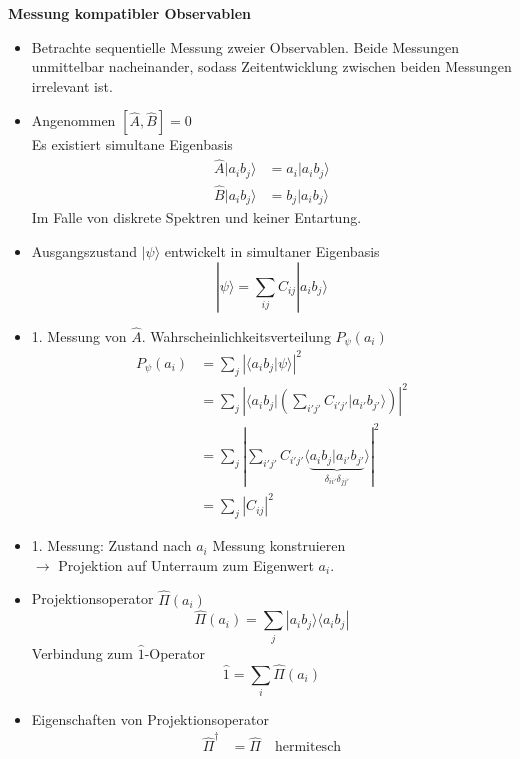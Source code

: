 \documentclass[10pt,article,colorback,accentcolor=tud9d]{scrartcl}
\begin{document}
\textbf{Messung kompatibler Observablen}\\
\begin{itemize}
	\item Betrachte sequentielle Messung zweier Observablen. Beide Messungen unmittelbar nacheinander, sodass Zeitentwicklung zwischen beiden Messungen irrelevant ist.
  \item Angenommen $\left[\hat{A},\hat{B}\right]=0$\\
    Es existiert simultane Eigenbasis
    \begin{align}
      \hat{A}|a_ib_j\rangle&=a_i|a_ib_j\rangle\\
      \hat{B}|a_ib_j\rangle&=b_j|a_ib_j\rangle
    \end{align}
    Im Falle von diskrete Spektren und keiner Entartung.
  \item Ausgangszustand $|\psi\rangle$ entwickelt in simultaner Eigenbasis
    \begin{equation}
    |\psi\rangle=\sum_{ij}C_{ij}|a_ib_j\rangle
    \end{equation}
  \item 1. Messung von $\hat{A}$. Wahrscheinlichkeitsverteilung $P_\psi(a_i)$
    \begin{align}
      P_\psi(a_i)&=\sum_j\left|\langle a_ib_j|\psi\rangle\right|^2\\
      &=\sum_j\left|\langle a_ib_j|\left(\sum_{i'j'}C_{i'j'}|a_{i'}b_{j'}\rangle\right)\right|^2\\
      &=\sum_j\left|\sum_{i'j'}C_{i'j'}\langle\underbrace{a_ib_j|a_{i'}b_{j'}}_{\delta_{ii'}\delta_{jj'}}\rangle\right|^2\\
      &=\sum_j\left|C_{ij}\right|^2
    \end{align}
  \item 1. Messung: Zustand nach $a_i$ Messung konstruieren\\
    $\rightarrow$ Projektion auf Unterraum zum Eigenwert $a_i$.
  \item Projektionsoperator $\hat{\Pi}(a_i)$
    \begin{equation}
      \hat{\Pi}(a_i)=\sum_j|a_ib_j\rangle\langle a_ib_j|
    \end{equation}
    Verbindung zum $\hat{1}$-Operator 
    \begin{equation}
    \hat{1}=\sum_i\hat{\Pi}(a_i)
    \end{equation}
  \item Eigenschaften von Projektionsoperator 
    \begin{align}
      \hat{\Pi}^\dagger&=\hat{\Pi} \quad \text{hermitesch}\\

\end{align}
\end{itemize}
\end{document}
